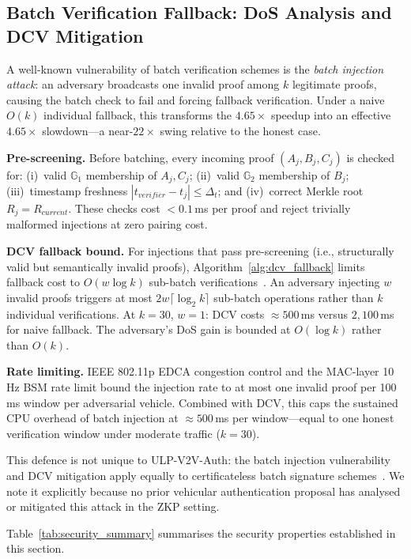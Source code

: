 \subsection{Batch Verification Fallback: DoS Analysis and DCV Mitigation}
\label{sec:dcv_security}

A well-known vulnerability of batch verification schemes is the \emph{batch
injection attack}: an adversary broadcasts one invalid proof among $k$ legitimate
proofs, causing the batch check to fail and forcing fallback verification. Under a
naive $O(k)$ individual fallback, this transforms the $4.65\times$ speedup into an
effective $4.65\times$ slowdown---a near-$22\times$ swing relative to the honest
case.

\textbf{Pre-screening.}
Before batching, every incoming proof $(A_j, B_j, C_j)$ is checked for: (i)~valid
$\mathbb{G}_1$ membership of $A_j, C_j$; (ii)~valid $\mathbb{G}_2$ membership of
$B_j$; (iii)~timestamp freshness $|t_{\mathit{verifier}} - t_j| \leq \Delta_t$;
and (iv)~correct Merkle root $R_j = R_{\mathit{current}}$. These checks cost
$< 0.1$\,ms per proof and reject trivially malformed injections at zero pairing
cost.

\textbf{DCV fallback bound.}
For injections that pass pre-screening (i.e., structurally valid but semantically
invalid proofs), Algorithm~\ref{alg:dcv_fallback} limits fallback cost to
$O(w \log k)$ sub-batch verifications~\cite{ferrara2008finding}. An adversary
injecting $w$ invalid proofs triggers at most $2w\lceil\log_2 k\rceil$ sub-batch
operations rather than $k$ individual verifications. At $k=30$, $w=1$: DCV costs
$\approx 500$\,ms versus $2{,}100$\,ms for naive fallback. The adversary's DoS
gain is bounded at $O(\log k)$ rather than $O(k)$.

\textbf{Rate limiting.}
IEEE 802.11p EDCA congestion control and the MAC-layer 10\,Hz BSM rate limit bound
the injection rate to at most one invalid proof per 100\,ms window per adversarial
vehicle. Combined with DCV, this caps the sustained CPU overhead of batch injection
at $\approx 500$\,ms per window---equal to one honest verification window under
moderate traffic ($k=30$).

This defence is not unique to ULP-V2V-Auth: the batch injection vulnerability and
DCV mitigation apply equally to certificateless batch signature
schemes~\cite{zhang2024}. We note it explicitly because no prior vehicular
authentication proposal has analysed or mitigated this attack in the ZKP setting.

Table~\ref{tab:security_summary} summarises the security properties established
in this section.

